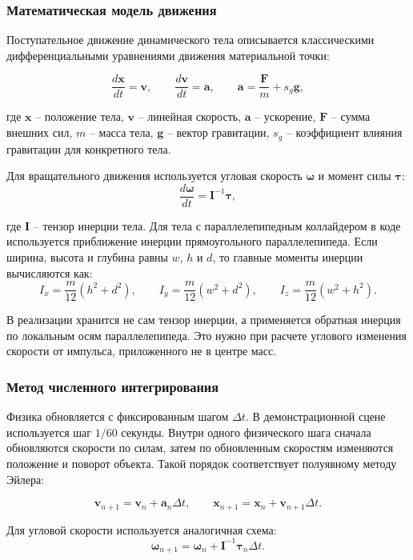 \subsubsection{Математическая модель движения}

Поступательное движение динамического тела описывается классическими
дифференциальными уравнениями движения материальной точки:

\[
\frac{d\mathbf{x}}{dt}=\mathbf{v},\qquad
\frac{d\mathbf{v}}{dt}=\mathbf{a},\qquad
\mathbf{a}=\frac{\mathbf{F}}{m}+s_g\mathbf{g},
\]

где \(\mathbf{x}\) -- положение тела, \(\mathbf{v}\) -- линейная скорость,
\(\mathbf{a}\) -- ускорение, \(\mathbf{F}\) -- сумма внешних сил, \(m\) -- масса
тела, \(\mathbf{g}\) -- вектор гравитации, \(s_g\) -- коэффициент влияния
гравитации для конкретного тела.

Для вращательного движения используется угловая скорость
\(\boldsymbol{\omega}\) и момент силы \(\boldsymbol{\tau}\):
\[
\frac{d\boldsymbol{\omega}}{dt}=\mathbf{I}^{-1}\boldsymbol{\tau},
\]

где \(\mathbf{I}\) -- тензор инерции тела. Для тела с параллелепипедным
коллайдером в коде используется приближение инерции прямоугольного
параллелепипеда. Если ширина, высота и глубина равны \(w\), \(h\) и \(d\), то
главные моменты инерции вычисляются как:
\[
I_x=\frac{m}{12}(h^2+d^2),\qquad
I_y=\frac{m}{12}(w^2+d^2),\qquad
I_z=\frac{m}{12}(w^2+h^2).
\]

В реализации хранится не сам тензор инерции, а применяется обратная инерция
по локальным осям параллелепипеда. Это нужно при расчете углового изменения
скорости от импульса, приложенного не в центре масс.

\subsubsection{Метод численного интегрирования}

Физика обновляется с фиксированным шагом \(\Delta t\). В демонстрационной сцене
используется шаг \(1/60\) секунды. Внутри одного физического шага сначала
обновляются скорости по силам, затем по обновленным скоростям изменяются
положение и поворот объекта. Такой порядок соответствует полуявному методу
Эйлера:

\[
\mathbf{v}_{n+1}=\mathbf{v}_{n}+\mathbf{a}_{n}\Delta t,
\qquad
\mathbf{x}_{n+1}=\mathbf{x}_{n}+\mathbf{v}_{n+1}\Delta t.
\]

Для угловой скорости используется аналогичная схема:
\[
\boldsymbol{\omega}_{n+1}=\boldsymbol{\omega}_{n}+\mathbf{I}^{-1}\boldsymbol{\tau}_{n}\Delta t.
\]

